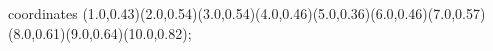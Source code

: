 					coordinates { (1.0,0.43)(2.0,0.54)(3.0,0.54)(4.0,0.46)(5.0,0.36)(6.0,0.46)(7.0,0.57)(8.0,0.61)(9.0,0.64)(10.0,0.82)};